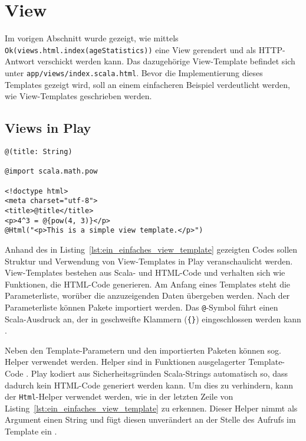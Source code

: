 

\section{View} %
\label{sec:view}

Im vorigen Abschnitt wurde gezeigt, wie mittels \lstinline|Ok(views.html.index(ageStatistics))| eine View gerendert und als HTTP-Antwort verschickt werden kann.
Das dazugehörige View-Template befindet sich unter \lstinline|app/views/index.scala.html|.
Bevor die Implementierung dieses Templates gezeigt wird, soll an einem einfacheren Beispiel verdeutlicht werden, wie View-Templates geschrieben werden.

\subsection{Views in Play} %
\label{sub:views_in_play}

\begin{lstlisting}[caption=Ein einfaches View-Template, label=lst:ein_einfaches_view_template]
@(title: String)

@import scala.math.pow

<!doctype html>
<meta charset="utf-8">
<title>@title</title>
<p>4^3 = @{pow(4, 3)}</p>
@Html("<p>This is a simple view template.</p>")
\end{lstlisting}

Anhand des in Listing~\ref{lst:ein_einfaches_view_template} gezeigten Codes sollen Struktur und Verwendung von View-Templates in Play veranschaulicht werden.
View-Templates bestehen aus Scala- und HTML-Code und verhalten sich wie Funktionen, die HTML-Code generieren.
Am Anfang eines Templates steht die Parameterliste, worüber die anzuzeigenden Daten übergeben werden.
Nach der Parameterliste können Pakete importiert werden.
Das \lstinline|@|-Symbol führt einen Scala-Ausdruck an, der in geschweifte Klammern (\lstinline|{}|) eingeschlossen werden kann \cite[vgl.][]{play_templates}.

Neben den Template-Parametern und den importierten Paketen können sog. Helper verwendet werden.
Helper sind in Funktionen ausgelagerter Template-Code \cite[vgl.][S.~179]{play_for_scala}.
Play kodiert aus Sicherheitsgründen Scala-Strings automatisch so, dass dadurch kein HTML-Code generiert werden kann.
Um dies zu verhindern, kann der \lstinline|Html|-Helper verwendet werden, wie in der letzten Zeile von Listing~\ref{lst:ein_einfaches_view_template} zu erkennen.
Dieser Helper nimmt als Argument einen String und fügt diesen unverändert an der Stelle des Aufrufs im Template ein \cite[vgl.][]{play_templates}.

